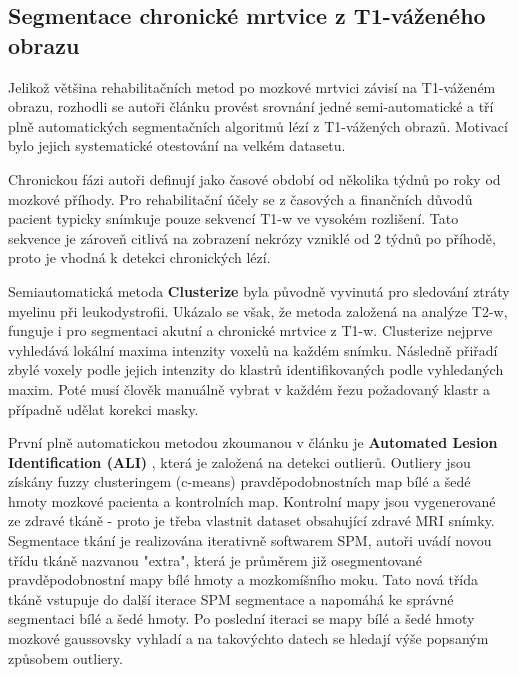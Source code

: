 \documentclass[11pt]{article}
\begin{document}
\subsection{Segmentace chronické mrtvice z T1-váženého obrazu}
Jelikož většina rehabilitačních metod po mozkové mrtvici závisí na T1-váženém obrazu, rozhodli se autoři článku \cite{Ito2018} provést srovnání jedné semi-automatické a tří plně automatických segmentačních algoritmů lézí z T1-vážených obrazů. Motivací bylo jejich systematické otestování na velkém datasetu.

Chronickou fázi autoři definují jako časové období od několika týdnů po roky od mozkové příhody. Pro rehabilitační účely se z časových a finančních důvodů pacient typicky snímkuje pouze sekvencí T1-w ve vysokém rozlišení. Tato sekvence je zároveň citlivá na zobrazení nekrózy vzniklé od 2 týdnů po příhodě, proto je vhodná k detekci chronických lézí.

Semiautomatická metoda \textbf{Clusterize} byla původně vyvinutá pro sledování ztráty myelinu při leukodystrofii. Ukázalo se však, že metoda založená na analýze T2-w, funguje i pro segmentaci akutní a chronické mrtvice z T1-w. \cite{DEHAAN201569} Clusterize nejprve vyhledává lokální maxima intenzity voxelů na každém snímku. Následně přiřadí zbylé voxely podle jejich intenzity do klastrů identifikovaných podle vyhledaných maxim. Poté musí člověk manuálně vybrat v každém řezu požadovaný klastr a případně udělat korekci masky.

První plně automatickou metodou zkoumanou v článku \cite{Ito2018} je \textbf{Automated Lesion Identification (ALI)} \cite{ali}, která je založená na detekci outlierů. Outliery jsou získány fuzzy clusteringem (c-means) pravděpodobnostních map bílé a šedé hmoty mozkové pacienta a kontrolních map. Kontrolní mapy jsou vygenerované ze zdravé tkáně - proto je třeba vlastnit dataset obsahující zdravé MRI snímky. Segmentace tkání je realizována iterativně softwarem \alert{SPM}, autoři uvádí novou třídu tkáně nazvanou "extra", která je průměrem již osegmentované pravděpodobnostní mapy bílé hmoty a mozkomíšního moku. Tato nová třída tkáně vstupuje do další iterace SPM segmentace a napomáhá ke správné segmentaci bílé a šedé hmoty. Po poslední iteraci se mapy bílé a šedé hmoty mozkové gaussovsky vyhladí a na takovýchto datech se hledají výše popsaným způsobem outliery.
\end{document}
